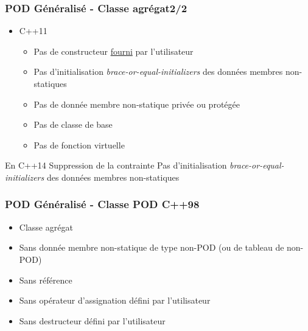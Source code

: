 \documentclass[C++.tex]{subfiles}
\begin{document}
\begin{frame}[fragile]
	\frametitle{POD Généralisé - Classe agrégat\titlehfill{}2/2}
	\begin{itemize}

		\item C++11
		\begin{itemize}
			\item Pas de constructeur \underline{fourni} par l'utilisateur


			\item Pas d'initialisation \textit{brace-or-equal-initializers} des données membres non-statiques
			\item Pas de donnée membre non-statique privée ou protégée
			\item Pas de classe de base
			\item Pas de fonction virtuelle
		\end{itemize}
	\end{itemize}

	\begin{block}{En C++14}
		Suppression de la contrainte \og Pas d'initialisation \textit{brace-or-equal-initializers} des données membres non-statiques\fg{}
	\end{block}
\end{frame}

\begin{frame}[fragile]
	\frametitle{POD Généralisé - Classe POD C++98}
	\begin{itemize}
		\item Classe agrégat
		\item Sans donnée membre non-statique de type non-POD (ou de tableau de non-POD)
		\item Sans référence
		\item Sans opérateur d'assignation défini par l'utilisateur
		\item Sans destructeur défini par l'utilisateur
	\end{itemize}
\end{frame}
\end{document}

